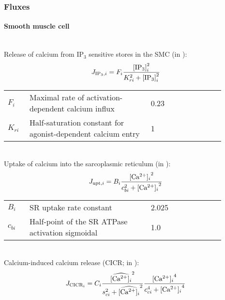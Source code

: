 \subsubsection*{Fluxes}
%
\paragraph{Smooth muscle cell}~\\
%
Release of calcium from IP$_{3}$ sensitive stores in the SMC (in \uMps):
\begin{equation} \label{eq:IP3i}
J_{\text{IP}_3,i} = F_{i}\frac{\text{[IP$_3$]}_{i}^{2}}{K_{ri}^{2}+\text{[IP$_3$]}_{i}^{2}}
\end{equation}
%
\begin{table}[h!]
\centering
\begin{tabular}{ p{0.09\linewidth}  >{\footnotesize} p{0.5\linewidth}  >{\footnotesize} p{0.27\linewidth} >{\footnotesize} p{0.03\linewidth} }
\hline
 $F_{i}$      			& Maximal rate of activation-dependent calcium influx			& 0.23 \uMps				& \cite{Koenigsberger2006} \\
$K_{ri}$				& Half-saturation constant for agonist-dependent calcium entry	& 1 \uM					& \cite{Koenigsberger2006} \\
\hline
\end{tabular}
\label{tab:IP3i}
\end{table}
\\
%
Uptake of calcium into the sarcoplasmic reticulum (in \uMs):
\begin{equation} \label{eq:JSRuptakei}
J_{\text{upt},i} = B_{i}\frac{\text{[Ca$^{2+}$]$_i$}^{2}}{c_{bi}^{2}+\text{[Ca$^{2+}$]$_i$}^{2}}
\end{equation}
%
\begin{table}[h!]
\centering
\begin{tabular}{ p{0.09\linewidth}  >{\footnotesize} p{0.5\linewidth}  >{\footnotesize} p{0.27\linewidth} >{\footnotesize} p{0.03\linewidth} }
\hline
$B_{i}$      			& SR uptake rate constant							& 2.025 \uMs				& \cite{Koenigsberger2006} \\
$c_{bi}$				& Half-point of the SR ATPase activation sigmoidal 	& 1.0 \uM					& \cite{Koenigsberger2006} \\
\hline
\end{tabular}
\label{tab:JSRuptakei}
\end{table}
\\
%
Calcium-induced calcium release (CICR; in \uMs):
\begin{equation} \label{eq:JCICRi}
J_{\text{CICR}_i} = C_{i}\frac{\widehat{\text{[Ca$^{2+}$]$_i$}}^{2}}{s_{ci}^{2}+\widehat{\text{[Ca$^{2+}$]$_i$}}^{2}}    \frac{\text{[Ca$^{2+}$]$_i$}^{4}}{c_{ci}^{4}+\text{[Ca$^{2+}$]$_i$}^{4}}
\end{equation}
